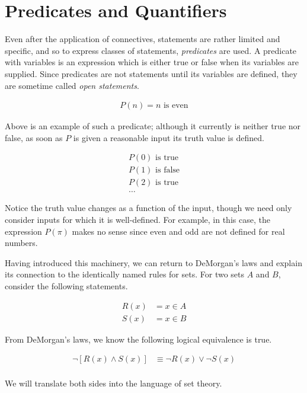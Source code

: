 \documentclass{report}
\begin{document}
\section{Predicates and Quantifiers}

Even after the application of connectives, statements are rather limited and specific, and so to express classes of statements, \emph{predicates}  are used. A predicate with variables is an expression which is either true or false when its variables are supplied. Since predicates are not statements until its variables are defined, they are sometime called \emph{open statements}.

\begin{align*}
	P(n) = n \text{ is even}
\end{align*}

Above is an example of such a predicate; although it currently is neither true nor false, as soon as $P$ is given a reasonable input its truth value is defined.

\begin{align*}
	P(0) \text{ is true} \\
	P(1) \text{ is false} \\
	P(2) \text{ is true} \\
	\dots
\end{align*}

Notice the truth value changes as a function of the input, though we need only consider inputs for which it is well-defined. For example, in this case, the expression $P(\pi)$ makes no sense since even and odd are not defined for real numbers.

Having introduced this machinery, we can return to DeMorgan's laws and explain its connection to the identically named rules for sets. For two sets $A$ and $B$, consider the following statements.

\begin{align*}
	R(x) &= x \in A \\
	S(x) &= x \in B
\end{align*}

From DeMorgan's laws, we know the following logical equivalence is true.

\begin{align*}
	\neg[R(x) \wedge S(x)] &\equiv \neg R(x) \lor \neg S(x) \\
\end{align*}

We will translate both sides into the language of set theory.
 
\end{document}
